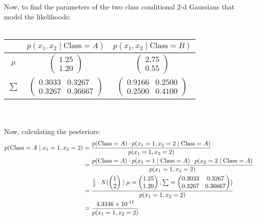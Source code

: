 \documentclass{article}
\begin{document}
Now, to find the parameters of the two class conditional 2-d Gaussians that model the likelihoods:
\\
\\
\begin{tabular}{|c|c|c|}
    \hline
    & \( p(x_1, x_2 \mid \text{Class} = A) \) & \( p(x_1, x_2 \mid \text{Class} = B) \) \\ 
    \hline
    \( \mu \) & $\begin{pmatrix} 1.25 \\ 1.20 \end{pmatrix}$ & $\begin{pmatrix} 2.75 \\  0.55 \end{pmatrix}$ \\
    \hline
    \( \sum \) & $\begin{pmatrix} 0.3033 & 0.3267 \\ 0.3267 & 0.36667 \end{pmatrix}$ & $\begin{pmatrix} 0.9166 & 0.2500 \\ 0.2500 & 0.4100 \end{pmatrix}$ \\
    \hline
\end{tabular}
\\
\\
Now, calculating the posteriors:
\begin{align*}
    p(\text{Class} = A \mid x_1 = 1, x_2 = 2) 
    &= \frac{p(\text{Class} = A) \cdot p(x_1 = 1, x_2 = 2 \mid \text{Class} = A)}{p(x_1 = 1, x_2 = 2)} \\
    &= \frac{p(\text{Class} = A) \cdot p(x_1 = 1 \mid \text{Class} = A) \cdot p(x_2 = 2 \mid \text{Class} = A)}{p(x_1 = 1, x_2 = 2)} \\
    &= \frac{\frac{1}{2} \cdot N(
        \begin{pmatrix}1 \\ 2\end{pmatrix} \mid
        \mu = \begin{pmatrix}1.25 \\ 1.20\end{pmatrix},
        \sum = \begin{pmatrix}0.3033 & 0.3267 \\ 0.3267 & 0.36667 \end{pmatrix}
    )}{p(x_1 = 1, x_2 = 2)} \\
    &= \frac{4.3346 \times 10\textsuperscript{-17}}{p(x_1 = 1, x_2 = 2)}
\end{align*}
\end{document}
